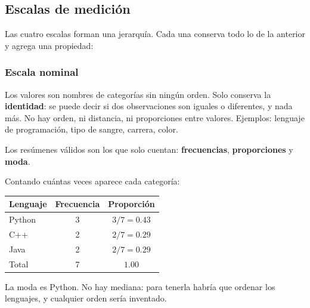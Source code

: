\documentclass[11pt,letterpaper]{article}
\begin{document}
\subsection*{Escalas de medición}

Las cuatro escalas forman una jerarquía. Cada una conserva todo lo de
la anterior y agrega una propiedad:

\begin{center}
\end{center}

\subsubsection*{Escala nominal}

Los valores son nombres de categorías sin ningún orden. Solo conserva
la \textbf{identidad}: se puede decir si dos observaciones son iguales
o diferentes, y nada más. No hay orden, ni distancia, ni proporciones
entre valores. Ejemplos: lenguaje de programación, tipo de sangre,
carrera, color.

Los resúmenes válidos son los que solo cuentan: \textbf{frecuencias},
\textbf{proporciones} y \textbf{moda}.

\begin{ejemplo}
    Contando cuántas veces aparece cada categoría:
    \begin{center}
    \begin{tabular}{lcc}
        \toprule
        \textbf{Lenguaje} & \textbf{Frecuencia} & \textbf{Proporción} \\
        \midrule
        Python & 3 & $3/7 = 0.43$ \\
        C++    & 2 & $2/7 = 0.29$ \\
        Java   & 2 & $2/7 = 0.29$ \\
        \midrule
        Total  & 7 & $1.00$ \\
        \bottomrule
    \end{tabular}
    \end{center}
    La moda es Python. No hay mediana: para tenerla habría que ordenar
    los lenguajes, y cualquier orden sería inventado.
\end{ejemplo}
\end{document}
